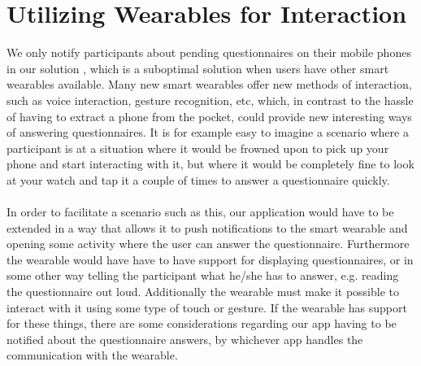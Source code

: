 
\section{Utilizing Wearables for Interaction}
\label{sec:utilizing_wearables_for_interaction}

We only notify participants about pending questionnaires on their mobile phones in our solution , which is a suboptimal solution when users have other smart wearables available. Many new smart wearables offer new methods of interaction, such as voice interaction, gesture recognition, etc, which, in contrast to the hassle of having to extract a phone from the pocket, could provide new interesting ways of answering questionnaires. It is for example easy to imagine a scenario where a participant is at a situation where it would be frowned upon to pick up your phone and start interacting with it, but where it would be completely fine to look at your watch and tap it a couple of times to answer a questionnaire quickly. 
\\\\
In order to facilitate a scenario such as this, our application would have to be extended in a way that allows it to push notifications to the smart wearable and opening some activity where the user can answer the questionnaire. Furthermore the wearable would have have to have support for displaying questionnaires, or in some other way telling the participant what he/she has to answer, e.g. reading the questionnaire out loud. Additionally the wearable must make it possible to interact with it using some type of touch or gesture. If the wearable has support for these things, there are some considerations regarding our app having to be notified about the questionnaire answers, by whichever app handles the communication with the wearable. 